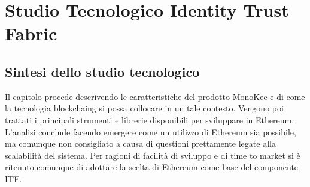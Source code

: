 \section{Studio Tecnologico Identity Trust Fabric}

\subsection{Sintesi dello studio tecnologico}
Il capitolo procede descrivendo le caratteristiche del prodotto MonoKee e di come la tecnologia \gls{blockchaing} si possa collocare in un tale contesto. Vengono poi trattati i principali strumenti e librerie disponibili per sviluppare in Ethereum. L’analisi conclude facendo emergere come un utilizzo di Ethereum sia possibile, ma comunque non consigliato a causa di questioni prettamente legate alla scalabilità del sistema. Per ragioni di facilità di sviluppo e di time to market si è ritenuto comunque di adottare la scelta di Ethereum come base del componente ITF.

